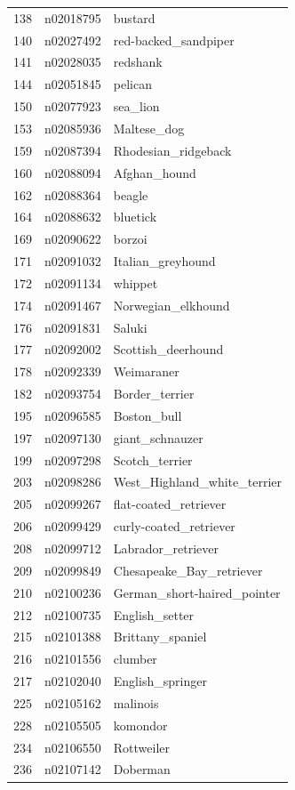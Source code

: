 \begin{table}
\begin{tabular}{cll}
138 & n02018795 & bustard \\
140 & n02027492 & red-backed_sandpiper \\
141 & n02028035 & redshank \\
144 & n02051845 & pelican \\
150 & n02077923 & sea_lion \\
153 & n02085936 & Maltese_dog \\
159 & n02087394 & Rhodesian_ridgeback \\
160 & n02088094 & Afghan_hound \\
162 & n02088364 & beagle \\
164 & n02088632 & bluetick \\
169 & n02090622 & borzoi \\
171 & n02091032 & Italian_greyhound \\
172 & n02091134 & whippet \\
174 & n02091467 & Norwegian_elkhound \\
176 & n02091831 & Saluki \\
177 & n02092002 & Scottish_deerhound \\
178 & n02092339 & Weimaraner \\
182 & n02093754 & Border_terrier \\
195 & n02096585 & Boston_bull \\
197 & n02097130 & giant_schnauzer \\
199 & n02097298 & Scotch_terrier \\
203 & n02098286 & West_Highland_white_terrier \\
205 & n02099267 & flat-coated_retriever \\
206 & n02099429 & curly-coated_retriever \\
208 & n02099712 & Labrador_retriever \\
209 & n02099849 & Chesapeake_Bay_retriever \\
210 & n02100236 & German_short-haired_pointer \\
212 & n02100735 & English_setter \\
215 & n02101388 & Brittany_spaniel \\
216 & n02101556 & clumber \\
217 & n02102040 & English_springer \\
225 & n02105162 & malinois \\
228 & n02105505 & komondor \\
234 & n02106550 & Rottweiler \\
236 & n02107142 & Doberman \\

\end{tabular}
\end{table}
